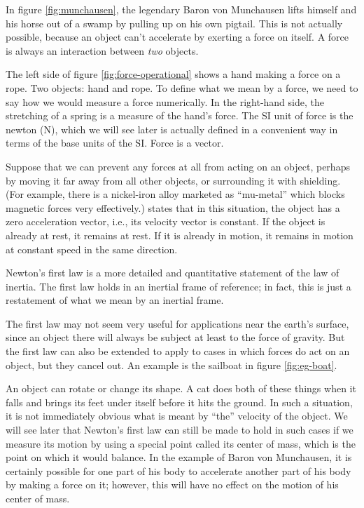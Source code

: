 In figure \ref{fig:munchausen}, the legendary Baron von Munchausen lifts himself and
his horse out of a swamp by pulling up on his own pigtail. 
This is not actually possible, because an object can't accelerate by exerting a force
on itself. A force is always an interaction between \emph{two} objects.


The left side of figure \ref{fig:force-operational} shows a hand making a force on a
rope. Two objects: hand and rope. To define what we mean by a force, we need to say how we would measure a
force numerically. In the right-hand side,
the stretching of a spring is a measure of the hand's force. The SI unit of force is
the newton (N), which we will see later is actually defined in a convenient way in terms
of the base units of the SI. Force is a vector.


Suppose that we can prevent any forces at all from acting on an object, perhaps by
moving it far away from all other objects, or surrounding it with shielding. (For example,
there is a nickel-iron alloy marketed as ``mu-metal'' which blocks magnetic forces very effectively.)
 states that in this situation,
the object has a zero acceleration vector, i.e., its velocity vector is constant.
If the object is already at rest, it remains at rest. If it is already in motion, it
remains in motion at constant speed in the same direction.

Newton's first law is a more detailed and quantitative statement of the law of inertia.
The first law holds in an inertial frame of reference; in fact, this is just a restatement
of what we mean by an inertial frame.


The first law may not seem very useful for applications near the earth's surface, since
an object there will always be subject at least to the force of gravity. But the first
law can also be extended to apply to cases in which forces do act on an object, but they
cancel out. An example is the sailboat in figure \ref{fig:eg-boat}.

An object can rotate or change its shape. A cat does both of these things when it falls and
brings its feet under itself before it hits the ground. In such a situation, it is not
immediately obvious what is meant by ``the'' velocity of the object. We will see later that
Newton's first law can still be made to hold in such cases if we measure its motion by using
a special point called its center of mass, which is the point on which it would balance.
In the example of Baron von Munchausen, it is certainly possible for one part of his body
to accelerate another part of his body by making a force on it; however, this will have
no effect on the motion of his center of mass.
